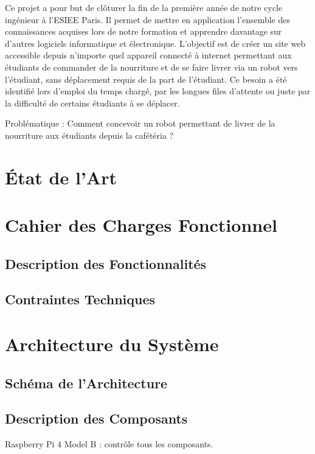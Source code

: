 \documentclass[a4paper,12pt]{report}  %
\begin{document}
	Ce projet a pour but de clôturer la fin de la première année de notre cycle ingénieur à 
	l'ESIEE Paris. Il permet de mettre en application l'ensemble des connaissances acquises 
	lors de notre formation et apprendre davantage sur d'autres logiciels informatique et 
	électronique.
	L'objectif est de créer un site web accessible depuis n'importe quel appareil connecté 
	à internet permettant aux étudiants de commander de la nourriture et de se faire livrer 
	via un robot vers l'étudiant, sans déplacement requis de la part de l'étudiant.
	Ce besoin a été identifié lors d'emploi du temps chargé, par les longues files 
	d'attente ou juste par la difficulté de certains étudiants à se déplacer.

	Problématique : Comment concevoir un robot permettant de livrer de la nourriture 
	aux étudiants depuis la cafétéria ?
	
	\section{État de l'Art}

	\section{Cahier des Charges Fonctionnel}
	\subsection{Description des Fonctionnalités}

	
	\subsection{Contraintes Techniques}
	
	\section{Architecture du Système}
	\subsection{Schéma de l'Architecture}
	
	\subsection{Description des Composants}
	Raspberry Pi 4 Model B : contrôle tous les composants.
\end{document}
